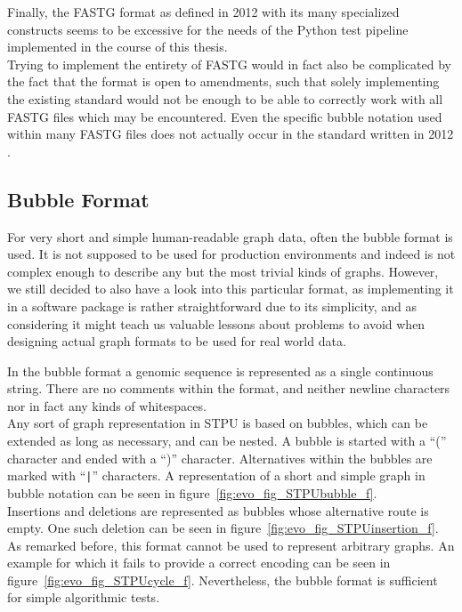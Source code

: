 \documentclass[a4paper,12pt,twoside,BCOR=10mm]{scrbook}
\def\pipe{\texttt{|}}
\begin{document}
Finally, the FASTG format as defined in 2012 with 
its many specialized constructs seems to be excessive for 
the needs of the Python test pipeline implemented in the course of this thesis. \\
Trying to implement the entirety of FASTG would in fact 
also be complicated by the fact that the format is open to amendments, 
such that solely implementing the existing standard would not be enough 
to be able to correctly work with all FASTG files which may be encountered. 
Even the specific bubble notation used within many FASTG files 
does not actually occur in the standard written in 2012 \citep{specGFA1,specFASTG}.

\subsection{Bubble Format}

For very short and simple human-readable graph data, 
often the bubble format is used. 
It is not supposed to be used for production environments and indeed 
is not complex enough to describe any but the most trivial kinds of graphs. 
However, we still decided to also have a look into this particular format, 
as implementing it in a software package is rather straightforward due to 
its simplicity, and as considering it might teach us valuable lessons 
about problems to avoid when designing actual graph formats to be used for real world data.

In the bubble format a genomic sequence is represented as a single continuous string. 
There are no comments within the format, 
and neither newline characters nor in fact any kinds of whitespaces. \\
Any sort of graph representation in STPU is based on bubbles, which can be extended as long as necessary, 
and can be nested. A bubble is started with a “(” character and ended 
with a “)” character. Alternatives within the bubbles are marked with “\pipe ” 
characters. 
A representation of a short and simple graph in bubble notation can be seen in figure~\ref{fig:evo_fig_STPUbubble_f}. \\
Insertions and deletions are represented as bubbles whose alternative route is empty. 
One such deletion can be seen in figure~\ref{fig:evo_fig_STPUinsertion_f}. \\
As remarked before, this format cannot be used to represent arbitrary graphs. 
An example for which it fails to provide a correct encoding can be seen in figure~\ref{fig:evo_fig_STPUcycle_f}. 
Nevertheless, the bubble format is sufficient for simple algorithmic tests.
\end{document}
